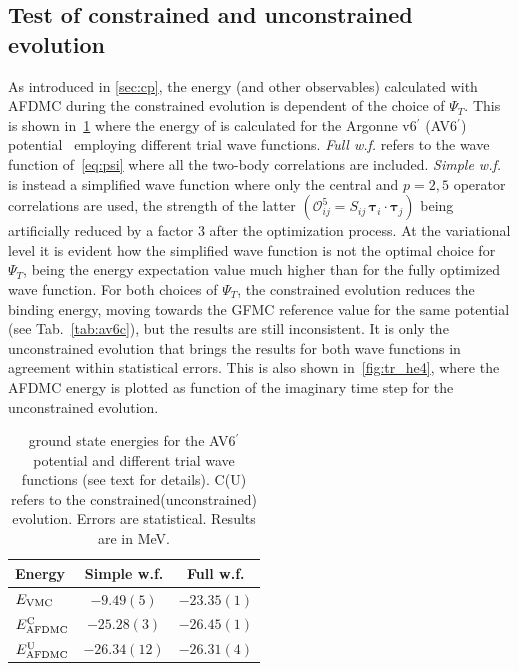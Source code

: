 \documentclass[aps,prc,twocolumn,superscriptaddress,floatfix]{revtex4-1}
\begin{document}
\subsection{Test of constrained and unconstrained evolution}
\label{sec:constr}
As introduced in \cref{sec:cp}, the energy (and other observables) calculated with AFDMC
during the constrained evolution is dependent of the choice of $\Psi_T$.
This is shown in~\cref{tab:tr} where the energy of  
is calculated for the Argonne v6$^\prime$ (AV6$^\prime$) potential~\cite{Wiringa:2002} 
employing different trial wave functions. 
\textit{Full w.f.} refers to the wave function of~\cref{eq:psi} where all the two-body 
correlations are included.
\textit{Simple w.f.} is instead a simplified wave function where only the central and
$p=2,5$ operator correlations are used, the strength of the latter 
$(\mathcal O_{ij}^5=S_{ij}\,\bm\tau_i\cdot\bm\tau_j)$ being artificially reduced by 
a factor 3 after the optimization process. At the variational level it is evident how
the simplified wave function is not the optimal choice for $\Psi_T$, being the energy
expectation value much higher than for the fully optimized wave function. For both choices
of $\Psi_T$, the constrained evolution reduces the binding energy, moving towards the
GFMC reference value for the same potential (see Tab.~\ref{tab:av6c}), but the results are still inconsistent.
It is only the unconstrained evolution that brings the results for both wave functions 
in agreement within statistical errors. This is also shown in~\cref{fig:tr_he4}, where the 
AFDMC energy is plotted as function of the imaginary time step for the unconstrained evolution. 

\setlength{\tabcolsep}{8pt}
\begin{table}[htb]
\centering
\caption[]{ ground state energies for the AV6$^\prime$ potential and different 
trial wave functions (see text for details). 
C(U) refers to the constrained(unconstrained) evolution.
Errors are statistical. Results are in MeV.}
\begin{tabular}{lcc}
\hline\hline
Energy & Simple w.f. & Full w.f. \\
\hline
$E_{\rm VMC}$           & $-9.49(5)$   & $-23.35(1)$ \\
$E_{\rm AFDMC}^{\rm C}$ & $-25.28(3)$  & $-26.45(1)$ \\
$E_{\rm AFDMC}^{\rm U}$ & $-26.34(12)$ & $-26.31(4)$ \\
\hline\hline
\end{tabular}
\label{tab:tr}
\end{table}
\setlength{\tabcolsep}{8pt}
\end{document}
